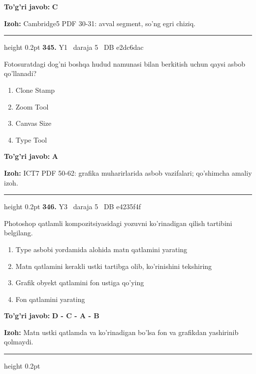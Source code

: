 \documentclass[10pt,a4paper,oneside]{article}
\begin{document}
\begin{tcolorbox}[enhanced,breakable,colback=teal!4,colframe=teal!45!black,boxrule=0.45pt,arc=1.2mm,left=2.8mm,right=2.8mm,top=2mm,bottom=2mm,before skip=2mm,after skip=2mm]
\textbf{\color{teal}To'g'ri javob:} \textbf{C}
\par\smallskip
\textbf{Izoh:} Cambridge5 PDF 30-31: avval segment, so'ng egri chiziq.
\end{tcolorbox}
\vspace{2mm}\hrule height 0.2pt \vspace{4mm}
\hypertarget{q345}{\textbf{\color{ink}345.}}  {\color{muted}\scriptsize Y1 \textbullet\ daraja 5 \textbullet\ DB e2dc6dac}
\par
Fotosuratdagi dog'ni boshqa hudud namunasi bilan berkitish uchun qaysi asbob qo'llanadi?
\begin{enumerate}[label=\Alph*),leftmargin=9mm]
\item Clone Stamp
\item Zoom Tool
\item Canvas Size
\item Type Tool
\end{enumerate}
\begin{tcolorbox}[enhanced,breakable,colback=teal!4,colframe=teal!45!black,boxrule=0.45pt,arc=1.2mm,left=2.8mm,right=2.8mm,top=2mm,bottom=2mm,before skip=2mm,after skip=2mm]
\textbf{\color{teal}To'g'ri javob:} \textbf{A}
\par\smallskip
\textbf{Izoh:} ICT7 PDF 50-62: grafika muharirlarida asbob vazifalari; qo'shimcha amaliy izoh.
\end{tcolorbox}
\vspace{2mm}\hrule height 0.2pt \vspace{4mm}
\hypertarget{q346}{\textbf{\color{ink}346.}}  {\color{muted}\scriptsize Y3 \textbullet\ daraja 5 \textbullet\ DB e4235f4f}
\par
Photoshop qatlamli kompozitsiyasidagi yozuvni ko'rinadigan qilish tartibini belgilang.
\begin{enumerate}[label=\Alph*),leftmargin=9mm]
\item Type asbobi yordamida alohida matn qatlamini yarating
\item Matn qatlamini kerakli ustki tartibga olib, ko'rinishini tekshiring
\item Grafik obyekt qatlamini fon ustiga qo'ying
\item Fon qatlamini yarating
\end{enumerate}
\begin{tcolorbox}[enhanced,breakable,colback=teal!4,colframe=teal!45!black,boxrule=0.45pt,arc=1.2mm,left=2.8mm,right=2.8mm,top=2mm,bottom=2mm,before skip=2mm,after skip=2mm]
\textbf{\color{teal}To'g'ri javob:} \textbf{D - C - A - B}
\par\smallskip
\textbf{Izoh:} Matn ustki qatlamda va ko'rinadigan bo'lsa fon va grafikdan yashirinib qolmaydi.
\end{tcolorbox}
\vspace{2mm}\hrule height 0.2pt \vspace{4mm}
\end{document}

